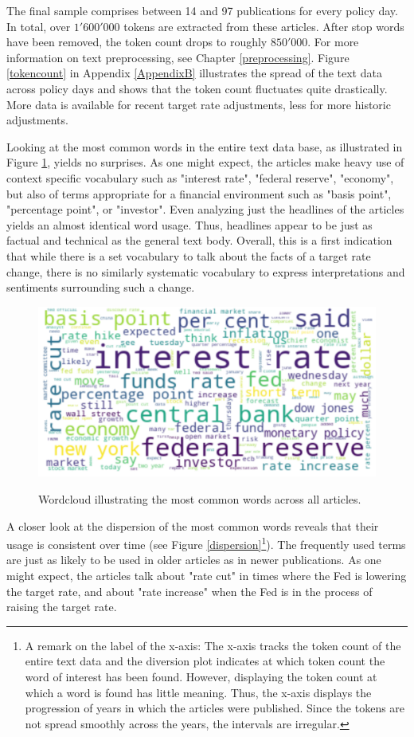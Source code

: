 \documentclass[11pt,a4paper,english,oneside]{book}
\numberwithin{equation}{chapter}
\begin{document}
The final sample comprises between 14 and 97 publications for every policy day. In total, over $1'600'000$ tokens are extracted from these articles. After stop words have been removed, the token count drops to roughly $850'000$. For more information on text preprocessing, see Chapter \ref{preprocessing}. Figure \ref{tokencount} in Appendix \ref{AppendixB} illustrates the spread of the text data across policy days and shows that the token count fluctuates quite drastically. More data is available for recent target rate adjustments, less for more historic adjustments.

Looking at the most common words in the entire text data base, as illustrated in Figure \ref{wcloud}, yields no surprises. As one might expect, the articles make heavy use of context specific vocabulary such as "interest rate", "federal reserve", "economy", but also of terms appropriate for a financial environment such as "basis point", "percentage point", or "investor". Even analyzing just the headlines of the articles yields an almost identical word usage. Thus, headlines appear to be just as factual and technical as the general text body. Overall, this is a first indication that while there is a set vocabulary to talk about the facts of a target rate change, there is no similarly systematic vocabulary to express interpretations and sentiments surrounding such a change. 

\begin{figure}
	\caption{Wordcloud illustrating the most common words across all articles.}
	\centering
	\includegraphics[scale=0.2]{Images/wordcloud.pdf}
	\label{wcloud}
\end{figure}

A closer look at the dispersion of the most common words reveals that their usage is consistent over time (see Figure \ref{dispersion}\footnote{A remark on the label of the x-axis: The x-axis tracks the token count of the entire text data and the diversion plot indicates at which token count the word of interest has been found. However, displaying the token count at which a word is found has little meaning. Thus, the x-axis displays the progression of years in which the articles were published. Since the tokens are not spread smoothly across the years, the intervals are irregular.}). The frequently used terms are just as likely to be used in older articles as in newer publications. As one might expect, the articles talk about "rate cut" in times where the Fed is lowering the target rate, and about "rate increase" when the Fed is in the process of raising the target rate.
\end{document}
